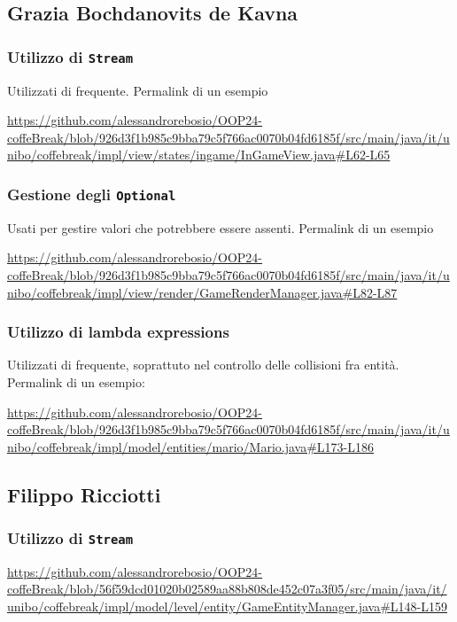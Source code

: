 \documentclass[a4paper,12pt]{report}
\begin{document}
\newpage
\subsection{Grazia Bochdanovits de Kavna}
\subsubsection{Utilizzo di \texttt{Stream}}
Utilizzati di frequente. Permalink di un esempio
\begin{sloppypar}
	\raggedright
	\url{https://github.com/alessandrorebosio/OOP24-coffeBreak/blob/926d3f1b985c9bba79c5f766ac0070b04fd6185f/src/main/java/it/unibo/coffebreak/impl/view/states/ingame/InGameView.java#L62-L65}
\end{sloppypar}

\subsubsection{Gestione degli \texttt{Optional}}
Usati per gestire valori che potrebbere essere assenti. Permalink di un esempio
\begin{sloppypar}
	\raggedright
	\url{https://github.com/alessandrorebosio/OOP24-coffeBreak/blob/926d3f1b985c9bba79c5f766ac0070b04fd6185f/src/main/java/it/unibo/coffebreak/impl/view/render/GameRenderManager.java#L82-L87}
\end{sloppypar}

\subsubsection{Utilizzo di lambda expressions}
Utilizzati di frequente, soprattuto nel controllo delle collisioni fra entità. Permalink di un esempio:
\begin{sloppypar}
	\raggedright
	\url{https://github.com/alessandrorebosio/OOP24-coffeBreak/blob/926d3f1b985c9bba79c5f766ac0070b04fd6185f/src/main/java/it/unibo/coffebreak/impl/model/entities/mario/Mario.java#L173-L186}
\end{sloppypar}

\newpage
\subsection{Filippo Ricciotti}
\subsubsection{Utilizzo di \texttt{Stream}}
\begin{sloppypar}
	\raggedright
	\url{https://github.com/alessandrorebosio/OOP24-coffeBreak/blob/56f59dcd01020b02589aa88b808de452c07a3f05/src/main/java/it/unibo/coffebreak/impl/model/level/entity/GameEntityManager.java#L148-L159}
\end{sloppypar}
\end{document}
